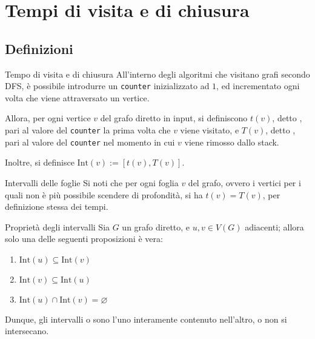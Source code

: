 \documentclass[a4paper, 12pt]{report}
\begin{document}
    \section{Tempi di visita e di chiusura}

    \subsection{Definizioni}

    \begin{frameddefn}{Tempo di visita e di chiusura}
        All'interno degli algoritmi che visitano grafi secondo DFS, è possibile introdurre un \texttt{counter} inizializzato ad $1$, ed incrementato ogni volta che viene attraversato un  vertice.

        Allora, per ogni vertice $v$ del grafo diretto in input, si definiscono $t(v)$, detto , pari al valore del \texttt{counter} la prima volta che $v$ viene visitato, e $T(v)$, detto , pari al valore del \texttt{counter} nel momento in cui $v$ viene rimosso dallo stack.

        Inoltre, si definisce $\mathrm{Int}(v) := [t(v), T(v)]$.
    \end{frameddefn}

    \begin{framedobs}{Intervalli delle foglie}
        Si noti che per ogni foglia $v$ del grafo, ovvero i vertici per i quali non è più possibile scendere di profondità, si ha $t(v) = T(v)$, per definizione stessa dei tempi.
    \end{framedobs}

    \begin{framedlem}[label={Intervalli diretto}]{Proprietà degli intervalli}
        Sia $G$ un grafo diretto, e $u, v \in V(G)$ adiacenti; allora solo una delle seguenti proposizioni è vera:
        \begin{enumerate}[label=\roman*), font=\itshape]
            \item $\mathrm{Int}(u) \subseteq \mathrm{Int}(v)$
            \item $\mathrm{Int}(v) \subseteq \mathrm{Int}(u)$
            \item $\mathrm{Int}(u) \cap \mathrm{Int}(v) = \varnothing$
        \end{enumerate}
        
        Dunque, gli intervalli o sono l'uno interamente contenuto nell'altro, o non si intersecano.
    \end{framedlem}
\end{document}
